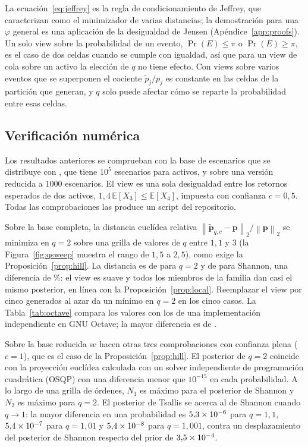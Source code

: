 \documentclass[11pt]{article}
\newcommand{\p}{\mathbf{p}}
\newcommand{\pt}{\tilde{\mathbf{p}}}
\newcommand{\E}{\mathbb{E}}
\newcommand{\norm}[1]{\left\lVert #1 \right\rVert}
\begin{document}
La ecuaci\'on~\eqref{eq:jeffrey} es la regla de condicionamiento de Jeffrey,
que \citet{DiaconisZabell1982} caracterizan como el minimizador de varias
distancias; la demostraci\'on para una $\varphi$ general es una aplicaci\'on de
la desigualdad de Jensen (Ap\'endice~\ref{app:proofs}). Un solo view sobre la
probabilidad de un evento, $\Pr(E) \le \pi$ o $\Pr(E) \ge \pi$, es el caso
de dos celdas cuando se cumple con igualdad, as\'i que para un view de cola sobre un
activo la elecci\'on de $q$ no tiene efecto. Con views sobre varios eventos
que se superponen el cociente $\tilde p_j / p_j$ es constante en las celdas
de la partici\'on que generan, y $q$ solo puede afectar c\'omo se reparte la
probabilidad entre esas celdas.

\subsection{Verificaci\'on num\'erica}\label{sec:numerics}

Los resultados anteriores se comprueban con la base de escenarios que se
distribuye con \citet{Meucci2008}, que tiene $10^5$ escenarios para
\nMeucciN{} activos, y sobre una versi\'on reducida a $1000$ escenarios. El
view es una sola desigualdad entre los retornos esperados de dos activos,
$1{,}4\,\E[X_3] \le \E[X_4]$, impuesta con confianza $c = 0{,}5$. Todas las
comprobaciones las produce un script del repositorio.

Sobre la base completa, la distancia eucl\'idea relativa
$\norm{\pt_{q,c} - \p}_2/\norm{\p}_2$ se minimiza en $q = 2$ sobre una grilla
de valores de $q$ entre $1{,}1$ y $3$ (la Figura~\ref{fig:qsweep} muestra el
rango de $1{,}5$ a $2{,}5$), como exige
la Proposici\'on~\ref{prop:hill}. La distancia es de \nQtwoErr{} para $q=2$ y de
\nShannonErr{} para Shannon, una diferencia de \nImprovPct\%: el view es
suave y todos los miembros de la familia dan casi el mismo posterior, en
l\'inea con la Proposici\'on~\ref{prop:local}. Reemplazar el view por cinco
generados al azar da un m\'inimo en $q=2$ en los cinco casos. La
Tabla~\ref{tab:octave} compara los valores con los de una implementaci\'on
independiente en GNU Octave; la mayor diferencia es de \nOctaveDiff.

Sobre la base reducida se hacen otras tres comprobaciones con confianza
plena ($c=1$), que es el caso de la Proposici\'on~\ref{prop:hill}. El posterior de
$q=2$ coincide con la proyecci\'on eucl\'idea calculada con un solver
independiente de programaci\'on cuadr\'atica (OSQP) con una diferencia menor
que $10^{-15}$ en cada probabilidad. A lo largo de una grilla de \'ordenes,
$N_1$ es m\'aximo para el posterior de Shannon y $N_2$ es m\'aximo para
$q = 2$. El posterior de Tsallis se acerca al de Shannon cuando $q \to 1$:
la mayor diferencia en una probabilidad es $5{,}3\times 10^{-6}$ para $q=1{,}1$,
$5{,}4\times 10^{-7}$ para $q = 1{,}01$ y $5{,}4\times 10^{-8}$ para $q=1{,}001$, contra un
desplazamiento del posterior de Shannon respecto del prior de
$3{,}5\times 10^{-4}$.
\end{document}
